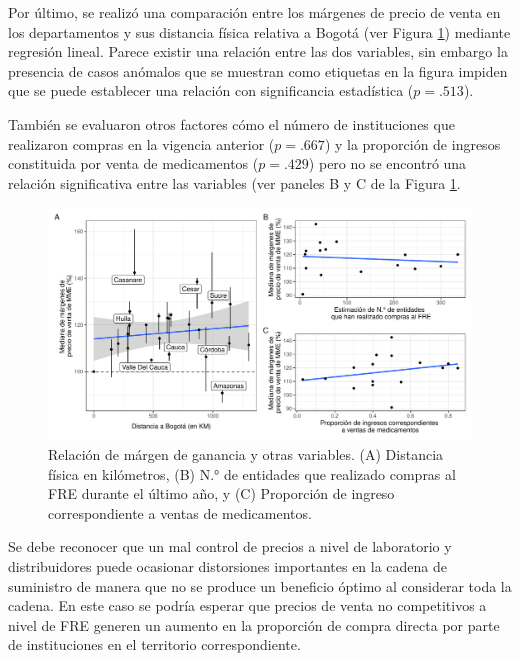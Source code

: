 \documentclass[
  oneside]{book}
\begin{document}
Por último, se realizó una comparación entre los márgenes de precio de venta en los departamentos y sus distancia física relativa a Bogotá (ver Figura \ref{fig:relacionMargenesCosto}) mediante regresión lineal. Parece existir una relación entre las dos variables, sin embargo la presencia de casos anómalos que se muestran como etiquetas en la figura impiden que se puede establecer una relación con significancia estadística (\(p = .513\)).

También se evaluaron otros factores cómo el número de instituciones que realizaron compras en la vigencia anterior (\(p = .667\)) y la proporción de ingresos constituida por venta de medicamentos (\(p = .429\)) pero no se encontró una relación significativa entre las variables (ver paneles B y C de la Figura \ref{fig:relacionMargenesCosto}.

\begin{figure}[b!]

{\centering \includegraphics[width=0.95\linewidth]{InformeFinal_files/figure-latex/relacionMargenesCosto-1} 

}

\caption{Relación de márgen de ganancia y otras variables. (A) Distancia física en kilómetros, (B) N.° de entidades que realizado compras al FRE durante el último año, y (C) Proporción de ingreso correspondiente a ventas de medicamentos.}\label{fig:relacionMargenesCosto}
\end{figure}

Se debe reconocer que un mal control de precios a nivel de laboratorio y distribuidores puede ocasionar distorsiones importantes en la cadena de suministro de manera que no se produce un beneficio óptimo al considerar toda la cadena. En este caso se podría esperar que precios de venta no competitivos a nivel de FRE generen un aumento en la proporción de compra directa por parte de instituciones en el territorio correspondiente.
\end{document}
